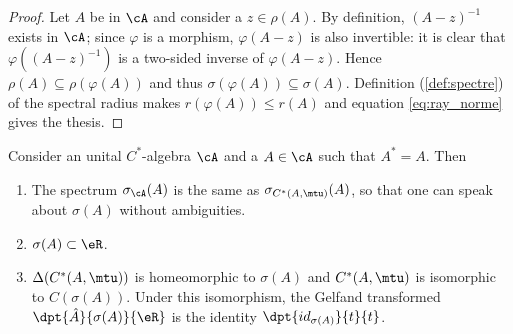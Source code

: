 \begin{proof}
Let $A$ be in $\cA$ and consider a $z\in\rho(A)$. By definition, $(A-z)^{-1}$ exists in $\cA$; since $\varphi$ is a morphism, $\varphi(A-z)$ is also invertible: it is clear that $\varphi( (A-z)^{-1} )$ is a two-sided inverse of $\varphi(A-z)$. Hence $\rho(A)\subseteq\rho(\varphi(A))$ and thus $\sigma(\varphi(A))\subseteq\sigma(A)$. Definition (\ref{def:spectre}) of the spectral radius makes $r(\varphi(A))\leq r(A)$ and equation \eqref{eq:ray_norme} gives the thesis.
\end{proof}


\begin{theorem}
 Consider an unital $C^{*}$-algebra $\cA$ and a $A\in\cA$ such that $A^*=A$. Then
\begin{enumerate}
\item The spectrum $\sigma_{\cA}(A)$ is the same as $\sigma_{C^*(A,\mtu)}(A)$, so that one can speak about $\sigma(A)$ without ambiguities.

\item $\sigma(A)\subset\eR$.

\item \label{enukiii} $\Delta(C^*(A,\mtu))$ is homeomorphic to $\sigma(A)$ and $C^*(A,\mtu)$ is isomorphic to $C(\sigma(A))$. Under this isomorphism, the Gelfand transformed $\dpt{\hat A}{\sigma(A)}{\eR}$ is the identity $\dpt{id_{\sigma(A)}}{t}{t}$.
\end{enumerate} \label{tho:l_2.5.1}
\end{theorem} 
